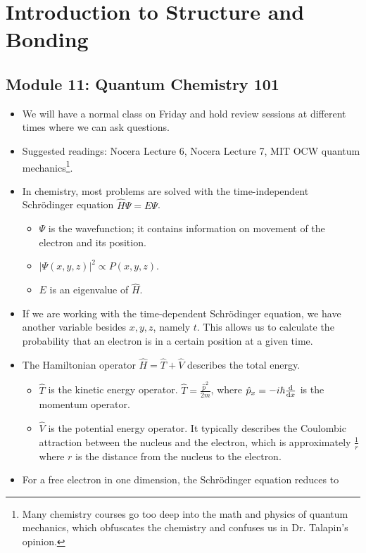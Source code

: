 \documentclass[../notes.tex]{subfiles}
\begin{document}
\chapter{Introduction to Structure and Bonding}
\section{Module 11: Quantum Chemistry 101}
\begin{itemize}
    \item {}We will have a normal class on Friday and hold review sessions at different times where we can ask questions.
    \item Suggested readings: Nocera Lecture 6, Nocera Lecture 7, MIT OCW quantum mechanics\footnote{Many chemistry courses go too deep into the math and physics of quantum mechanics, which obfuscates the chemistry and confuses us in Dr. Talapin's opinion.}.
    \item In chemistry, most problems are solved with the time-independent Schr\"{o}dinger equation $\hat{H}\Psi=E\Psi$.
    \begin{itemize}
        \item $\Psi$ is the wavefunction; it contains information on movement of the electron and its position.
        \item $|\Psi(x,y,z)|^2\propto P(x,y,z)$.
        \item $E$ is an eigenvalue of $\hat{H}$.
    \end{itemize}
    \item If we are working with the time-dependent Schr\"{o}dinger equation, we have another variable besides $x,y,z$, namely $t$. This allows us to calculate the probability that an electron is in a certain position at a given time.
    \item The Hamiltonian operator $\hat{H}=\hat{T}+\hat{V}$ describes the total energy.
    \begin{itemize}
        \item $\hat{T}$ is the kinetic energy operator. $\hat{T}=\frac{\hat{p}^2}{2m}$, where $\hat{p}_x=-i\hbar\dv{x}$ is the momentum operator.
        \item $\hat{V}$ is the potential energy operator. It typically describes the Coulombic attraction between the nucleus and the electron, which is approximately $\frac{1}{r}$ where $r$ is the distance from the nucleus to the electron.
    \end{itemize}
    \item For a free electron in one dimension, the Schr\"{o}dinger equation reduces to

\end{itemize}
\end{document}

